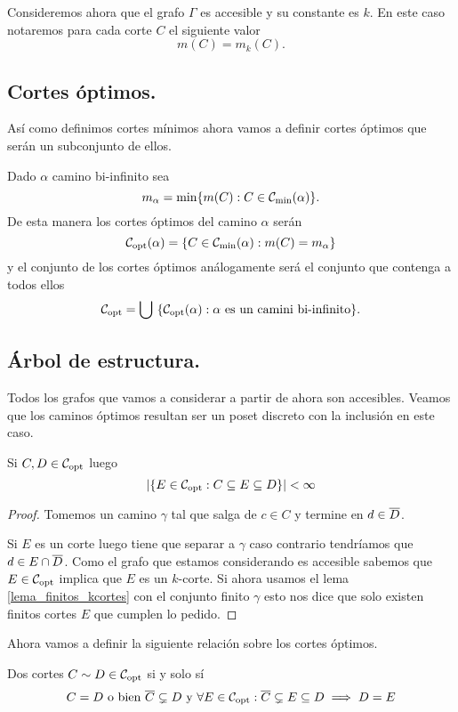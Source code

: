 \documentclass[tesis.tex]{subfiles}
\begin{document}
Consideremos ahora que el grafo $\Gamma$ es accesible y su constante es $k$.
En este caso notaremos para cada corte $C$ el siguiente valor
\[
	m(C) = m_k(C).
\]

\subsection{Cortes óptimos.}

Así como definimos cortes mínimos ahora vamos a definir cortes óptimos que serán un subconjunto de ellos.

\begin{deff}
	Dado $\alpha$ camino bi-infinito sea
	\[
		m_\alpha = \min \{ m(C) : C \in {\cal C}_{\text{min}}(\alpha) \}.
	\]
	De esta manera los cortes óptimos del camino $\alpha$ serán
	\[
		{\cal C}_{\text{opt}}(\alpha) = \{ C \in {\cal C}_{\text{min}}(\alpha) : m(C) = m_\alpha  \}
	\]
	y el conjunto de los cortes óptimos análogamente será el conjunto que contenga a todos ellos
	\[
		{\cal C}_{\text{opt}} = \bigcup \ \{ {\cal C}_{\text{opt}}(\alpha) : \alpha \ \text{es un camini bi-infinito}  \}.
	\]
\end{deff}


\subsection{Árbol de estructura.}

Todos los grafos que vamos a considerar a partir de ahora son accesibles.
Veamos que los caminos óptimos resultan ser un poset discreto con la inclusión en este caso.

\begin{lema}\label{lema_intermedios}
	Si $C,D \in {\cal C}_{\text{opt}}$ luego 
	\[
	|\{ E \in {\cal C}_{\text{opt}} : C \subseteq E \subseteq D \}| < \infty
	\]
\end{lema}
\begin{proof}
	Tomemos un camino $\gamma$ tal que salga de $c \in C$ y termine en $d \in \overline D$.
	
	Si $E$ es un corte luego tiene que separar a $\gamma$ caso contrario tendríamos que $d \in E \cap \overline D$.
	Como el grafo que estamos considerando es accesible sabemos que $E \in {\cal C}_{\text{opt}}$ implica que $E$ es un $k$-corte.
	Si ahora usamos el lema \ref{lema_finitos_kcortes} con el conjunto finito $\gamma$ esto nos dice que solo existen finitos cortes $E$ que cumplen lo pedido.
\end{proof}

Ahora vamos a definir la siguiente relación sobre los cortes óptimos.

\begin{deff}
	Dos cortes $C \sim D \in {\cal C}_{\text{opt}}$ si y solo sí
	\[
		C = D \ \text{o bien} \ \overline C \subsetneq D \ \text{y} \ \forall E \in {\cal C}_{\text{opt}} : \overline C \subsetneq E \subseteq D \implies D = E
	\]
\end{deff}
\end{document}
